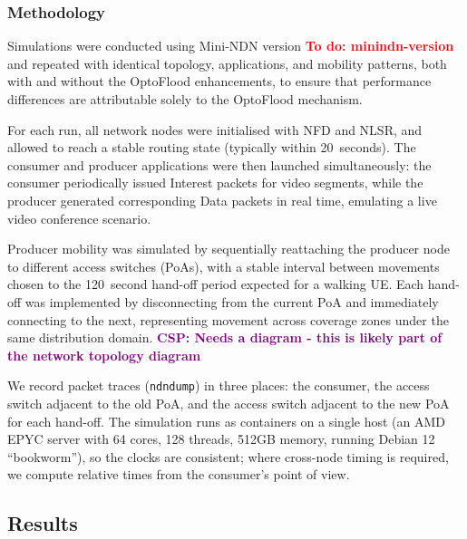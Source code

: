 \documentclass[10pt,conference]{IEEEtran}
\newcommand{\todo}[1]{\textbf{\textcolor{red}{To do: #1}}}
\newcommand{\csp}[1]{\textbf{\textcolor{purple}{CSP: #1}}}
\begin{document}
\subsubsection{Methodology}

Simulations were conducted using Mini-NDN version \todo{minindn-version} \cite{FIXME} and repeated with identical topology, applications, and mobility patterns, both with and without the OptoFlood enhancements, to ensure that performance differences are attributable solely to the OptoFlood mechanism.

For each run, all network nodes were initialised with NFD and NLSR, and allowed to reach a stable routing state (typically within 20~seconds). The consumer and producer applications were then launched simultaneously: the consumer periodically issued Interest packets for video segments, while the producer generated corresponding Data packets in real time, emulating a live video conference scenario.

Producer mobility was simulated by sequentially reattaching the producer node to different access switches (PoAs), with a stable interval between movements chosen to the 120~second hand-off period expected for a walking UE. Each hand-off was implemented by disconnecting from the current PoA and immediately connecting to the next, representing movement across coverage zones under the same distribution domain.
\csp{Needs a diagram - this is likely part of the network topology diagram}


We record packet traces (\texttt{ndndump}) in three places: the consumer, the access switch adjacent to the old PoA, and the access switch adjacent to the new PoA for each hand-off. 
The simulation runs as containers on a single host (an AMD EPYC server with 64 cores, 128 threads, 512GB memory, running Debian 12 ``bookworm''), so the clocks are consistent; where cross-node timing is required, we compute relative times from the consumer’s point of view.


\subsection{Results}
\end{document}

